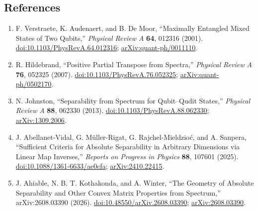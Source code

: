 \subsection*{References}

\begin{enumerate}[label={},leftmargin=4.8em,labelsep=0.5em]
  \footnotesize
  \item[\textup{[VAD01]}]\label{ref:p15-verstraete-et-al}
  F. Verstraete, K. Audenaert, and B. De Moor,
  ``Maximally Entangled Mixed States of Two Qubits,''
  \emph{Physical Review A} \textbf{64}, 012316 (2001).
  \href{https://doi.org/10.1103/PhysRevA.64.012316}{doi:10.1103/PhysRevA.64.012316};
  \href{https://arxiv.org/abs/quant-ph/0011110}{arXiv:quant-ph/0011110}.

  \item[\textup{[Hil07]}]\label{ref:p15-hildebrand}
  R. Hildebrand,
  ``Positive Partial Transpose from Spectra,''
  \emph{Physical Review A} \textbf{76}, 052325 (2007).
  \href{https://doi.org/10.1103/PhysRevA.76.052325}{doi:10.1103/PhysRevA.76.052325};
  \href{https://arxiv.org/abs/quant-ph/0502170}{arXiv:quant-ph/0502170}.

  \item[\textup{[Joh13]}]\label{ref:p15-johnston}
  N. Johnston,
  ``Separability from Spectrum for Qubit--Qudit States,''
  \emph{Physical Review A} \textbf{88}, 062330 (2013).\newline
  \href{https://doi.org/10.1103/PhysRevA.88.062330}{doi:10.1103/PhysRevA.88.062330};
  \href{https://arxiv.org/abs/1309.2006}{arXiv:1309.2006}.

  \item[\textup{[AMR+25]}]\label{ref:p15-abellanet-vidal-et-al}
  J. Abellanet-Vidal, G. Müller-Rigat, G. Rajchel-Mieldzioć, and A. Sanpera,
  ``Sufficient Criteria for Absolute Separability in Arbitrary Dimensions
  via Linear Map Inverses,''
  \emph{Reports on Progress in Physics} \textbf{88}, 107601 (2025).
  \href{https://doi.org/10.1088/1361-6633/ae0cfa}{doi:10.1088/1361-6633/ae0cfa};
  \href{https://arxiv.org/abs/2410.22415}{arXiv:2410.22415}.

  \item[\textup{[AKW26]}]\label{ref:p15-ahiable-et-al}
  J. Ahiable, N. B. T. Kothakonda, and A. Winter,
  ``The Geometry of Absolute Separability and Other Convex Matrix Properties
  from Spectrum,'' arXiv:2608.03390 (2026).
  \href{https://doi.org/10.48550/arXiv.2608.03390}{doi:10.48550/arXiv.2608.03390};
  \href{https://arxiv.org/abs/2608.03390}{arXiv:2608.03390}.


\end{enumerate}
